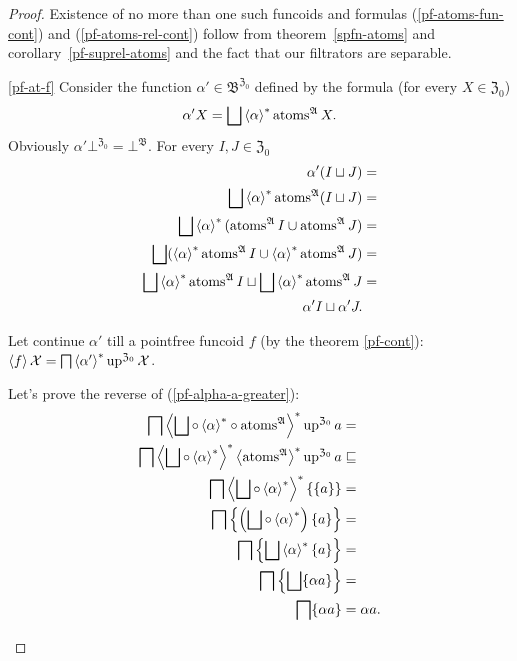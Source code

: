 \begin{proof}
Existence of no more than one such funcoids and formulas (\ref{pf-atoms-fun-cont})
and (\ref{pf-atoms-rel-cont}) follow from theorem~\ref{spfn-atoms}
and corollary~\ref{pf-suprel-atoms} and the fact that our filtrators
are separable.
\begin{widedisorder}
\item [{\ref{pf-at-f}}] Consider the function $\alpha'\in\mathfrak{B}^{\mathfrak{Z}_{0}}$
defined by the formula (for every $X\in\mathfrak{Z}_{0}$) 
\[
\alpha'X=\bigsqcup\rsupfun{\alpha}\atoms^{\mathfrak{A}}X.
\]
Obviously $\alpha'\bot^{\mathfrak{Z}_{0}}=\bot^{\mathfrak{B}}$. For every
$I,J\in\mathfrak{Z}_{0}$
\begin{align*}
\alpha'(I\sqcup J) & =\\
\bigsqcup\rsupfun{\alpha}\atoms^{\mathfrak{A}}(I\sqcup J) & =\\
\bigsqcup\rsupfun{\alpha}(\atoms^{\mathfrak{A}}I\cup\atoms^{\mathfrak{A}}J) & =\\
\bigsqcup(\rsupfun{\alpha}\atoms^{\mathfrak{A}}I\cup\rsupfun{\alpha}\atoms^{\mathfrak{A}}J) & =\\
\bigsqcup\rsupfun{\alpha}\atoms^{\mathfrak{A}}I\sqcup\bigsqcup\rsupfun{\alpha}\atoms^{\mathfrak{A}}J & =\\
\alpha'I\sqcup\alpha'J.
\end{align*}



Let continue $\alpha'$ till a pointfree funcoid $f$ (by the theorem
\ref{pf-cont}): $\left\langle f\right\rangle\mathcal{X}=\bigsqcap\left\langle \alpha'\right\rangle ^{\ast}\operatorname{up}^{\mathfrak{Z}_{0}}\mathcal{X}$.


Let's prove the reverse of (\ref{pf-alpha-a-greater}):
\begin{align*}
\bigsqcap\rsupfun{\bigsqcup\circ\rsupfun{\alpha}\circ\atoms^{\mathfrak{A}}}\up^{\mathfrak{Z}_{0}}a & =\\
\bigsqcap\rsupfun{\bigsqcup\circ\rsupfun{\alpha}}\rsupfun{\atoms^{\mathfrak{A}}}\up^{\mathfrak{Z}_{0}}a & \sqsubseteq\\
\bigsqcap\rsupfun{\bigsqcup\circ\rsupfun{\alpha}}\{\{a\}\} & =\\
\bigsqcap\left\{ \left(\bigsqcup\circ\rsupfun{\alpha}\right)\{a\}\right\}  & =\\
\bigsqcap\left\{ \bigsqcup\rsupfun{\alpha}\{a\}\right\}  & =\\
\bigsqcap\left\{ \bigsqcup\{\alpha a\}\right\}  & =\\
\bigsqcap\{\alpha a\} & =\alpha a.
\end{align*}




\end{widedisorder}
\end{proof}
